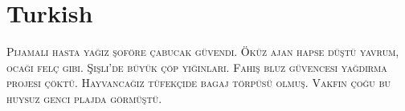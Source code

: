 

\presection\section*{\checkno Turkish}\postsection

\textsc{Pijamalı hasta yağız şoföre çabucak güvendi.
Öküz ajan hapse düştü yavrum, ocağı felç gibi.
Şişli’de büyük çöp yığınları.
Fahiş bluz güvencesi yağdırma projesi çöktü.
Hayvancağız tüfekçide bagaj törpüsü olmuş.
Vakfın çoğu bu huysuz genci plajda görmüştü.}